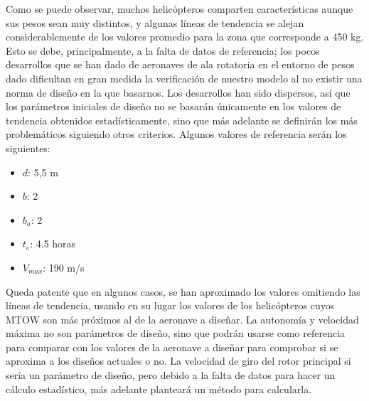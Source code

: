 Como se puede observar, muchos helicópteros comparten características aunque sus pesos sean muy distintos, y algunas líneas de tendencia se alejan considerablemente de los valores promedio para la zona que corresponde a 450 kg. Esto se debe, principalmente, a la falta de datos de referencia; los pocos desarrollos que se han dado de aeronaves de ala rotatoria en el entorno de pesos dado dificultan en gran medida la verificación de nuestro modelo al no existir una norma de diseño en la que basarnos. Los desarrollos han sido dispersos, así que los parámetros iniciales de diseño no se basarán únicamente en los valores de tendencia obtenidos estadísticamente, sino que más adelante se definirán los más problemáticos siguiendo otros criterios.
Algunos valores de referencia serán los siguientes:

\begin{itemize}
	\item $d$: 5,5 m
	\item $b$: 2
	\item $b_{a}$: 2
	\item $t_{e}$: 4.5 horas
	\item $V_{max}$: 190 m/s
\end{itemize}

Queda patente que en algunos casos, se han aproximado los valores omitiendo las líneas de tendencia, usando en su lugar los valores de los helicópteros cuyos MTOW son más próximos al de la aeronave a diseñar.
La autonomía y velocidad máxima no son parámetros de diseño, sino que podrán usarse como referencia para comparar con los valores de la aeronave a diseñar para comprobar si se aproxima a los diseños actuales o no.
La velocidad de giro del rotor principal si sería un parámetro de diseño, pero debido a la falta de datos para hacer un cálculo estadístico, más adelante planteará un método para calcularla.
